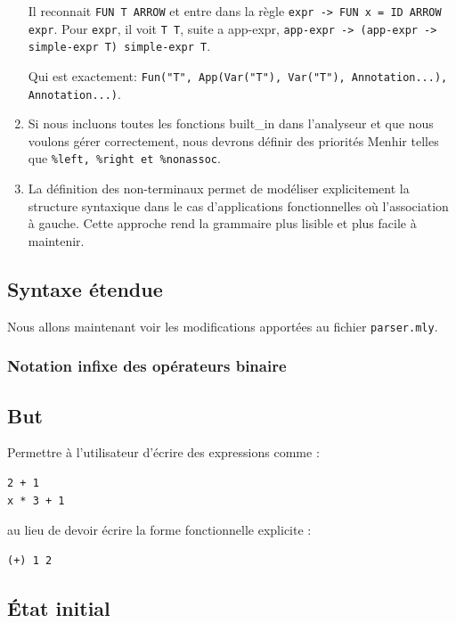 \begin{enumerate}[label=\arabic*.]
          Il reconnait \texttt{FUN T ARROW} et entre dans la règle \texttt{expr -> FUN x = ID ARROW expr}. Pour \texttt{expr}, il voit \texttt{T T}, suite a app-expr, \texttt{app-expr -> (app-expr -> simple-expr T) simple-expr T}.

          Qui est exactement:
          \texttt{Fun("T", App(Var("T"), Var("T"), Annotation...), Annotation...)}.

    \item Si nous incluons toutes les fonctions built\_in dans l'analyseur et que nous voulons gérer correctement, nous devrons définir des priorités Menhir telles que \texttt{\%left, \%right et \%nonassoc}.

    \item La définition des non-terminaux permet de modéliser explicitement la structure syntaxique dans le cas d'applications fonctionnelles où l'association à gauche. Cette approche rend la grammaire plus lisible et plus facile à maintenir.

\end{enumerate}

\subsection{Syntaxe étendue}

Nous allons maintenant voir les modifications apportées au fichier \texttt{parser.mly}.

\subsubsection{Notation infixe des opérateurs binaire}

\subsection*{But}
Permettre à l'utilisateur d'écrire des expressions comme :
\begin{lstlisting}
2 + 1
x * 3 + 1
\end{lstlisting}

au lieu de devoir écrire la forme fonctionnelle explicite :

\begin{lstlisting}
(+) 1 2
\end{lstlisting}

\subsection*{État initial}


